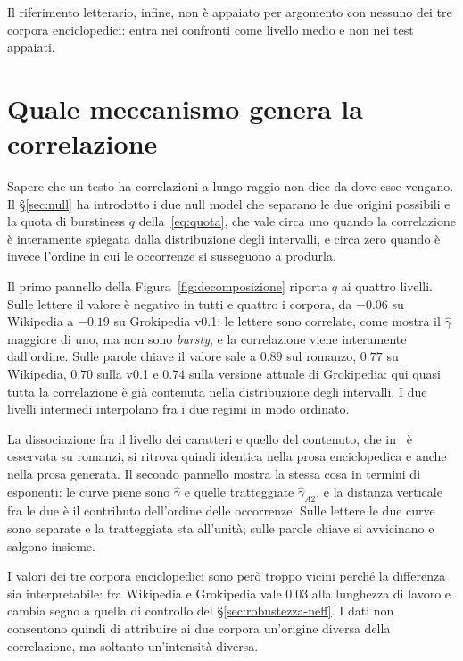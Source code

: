 Il riferimento letterario, infine, non è appaiato per argomento con nessuno dei
tre corpora enciclopedici: entra nei confronti come livello medio e non nei test
appaiati.

\section{Quale meccanismo genera la correlazione}
\label{sec:decomposizione}

Sapere che un testo ha correlazioni a lungo raggio non dice da dove esse
vengano. Il §\ref{sec:null} ha introdotto i due null model che separano le due
origini possibili e la quota di burstiness $q$ della~\eqref{eq:quota}, che vale
circa uno quando la correlazione è interamente spiegata dalla distribuzione
degli intervalli, e circa zero quando è invece l'ordine in cui le occorrenze si
susseguono a produrla.

Il primo pannello della Figura~\ref{fig:decomposizione} riporta $q$ ai quattro
livelli. Sulle lettere il valore è negativo in tutti e quattro i corpora, da
$-0.06$ su Wikipedia a $-0.19$ su Grokipedia v0.1: le lettere sono correlate,
come mostra il $\hat\gamma$ maggiore di uno, ma non sono \emph{bursty}, e la
correlazione viene interamente dall'ordine. Sulle parole chiave il valore sale a
$0.89$ sul romanzo, $0.77$ su Wikipedia, $0.70$ sulla v0.1 e $0.74$ sulla
versione attuale di Grokipedia: qui quasi tutta la correlazione è già contenuta nella
distribuzione degli intervalli. I due livelli intermedi interpolano fra i due
regimi in modo ordinato.

La dissociazione fra il livello dei caratteri e quello del contenuto, che
in~\cite{altmann2012} è osservata su romanzi, si ritrova quindi identica nella
prosa enciclopedica e anche nella prosa generata. Il secondo pannello mostra la
stessa cosa in termini di esponenti: le curve piene sono $\hat\gamma$ e quelle
tratteggiate $\hat\gamma_{A2}$, e la distanza verticale fra le due è il
contributo dell'ordine delle occorrenze. Sulle lettere le due curve sono
separate e la tratteggiata sta all'unità; sulle parole chiave si avvicinano e
salgono insieme.

I valori dei tre corpora enciclopedici sono però troppo vicini perché la
differenza sia interpretabile: fra Wikipedia e Grokipedia vale $0.03$ alla
lunghezza di lavoro e cambia segno a quella di controllo del
§\ref{sec:robustezza-neff}. I dati non consentono quindi di attribuire ai due
corpora un'origine diversa della correlazione, ma soltanto un'intensità diversa.

